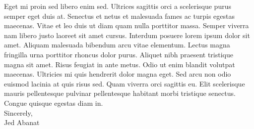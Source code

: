 Eget mi proin sed libero enim sed. Ultrices sagittis orci a scelerisque purus semper eget duis at. Senectus et netus et malesuada fames ac turpis egestas maecenas. Vitae et leo duis ut diam quam nulla porttitor massa. Semper viverra nam libero justo laoreet sit amet cursus. Interdum posuere lorem ipsum dolor sit amet. Aliquam malesuada bibendum arcu vitae elementum. Lectus magna fringilla urna porttitor rhoncus dolor purus. Aliquet nibh praesent tristique magna sit amet. Risus feugiat in ante metus. Odio ut enim blandit volutpat maecenas. Ultricies mi quis hendrerit dolor magna eget. Sed arcu non odio euismod lacinia at quis risus sed. Quam viverra orci sagittis eu. Elit scelerisque mauris pellentesque pulvinar pellentesque habitant morbi tristique senectus. Congue quisque egestas diam in. \\

Sincerely,\\
Jed Abanat